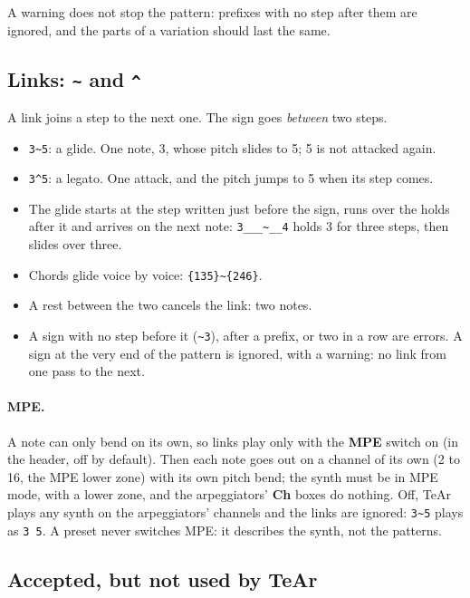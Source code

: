 \documentclass[11pt,a4paper]{article}
\newcommand{\pat}[1]{\texttt{#1}}
\begin{document}
A warning does not stop the pattern: prefixes with no step after them are
ignored, and the parts of a variation should last the same.

\subsection{Links: \pat{\textasciitilde} and \pat{\textasciicircum}}
\label{sec:links}

A link joins a step to the next one. The sign goes \emph{between} two steps.

\begin{itemize}[leftmargin=1.5em]
  \item \pat{3\textasciitilde5}: a glide. One note, 3, whose pitch slides to 5;
        5 is not attacked again.
  \item \pat{3\textasciicircum5}: a legato. One attack, and the pitch jumps to
        5 when its step comes.
  \item The glide starts at the step written just before the sign, runs over the
        holds after it and arrives on the next note:
        \pat{3\_\_\_\textasciitilde\_\_4} holds 3 for three steps, then slides
        over three.
  \item Chords glide voice by voice: \pat{\{135\}\textasciitilde\{246\}}.
  \item A rest between the two cancels the link: two notes.
  \item A sign with no step before it (\pat{\textasciitilde3}), after a prefix,
        or two in a row are errors. A sign at the very end of the pattern is
        ignored, with a warning: no link from one pass to the next.
\end{itemize}

\paragraph{MPE.} A note can only bend on its own, so links play only with the
\textbf{MPE} switch on (in the header, off by default). Then each note goes out on
a channel of its own (2 to 16, the MPE lower zone) with its own pitch bend; the
synth must be in MPE mode, with a lower zone, and the arpeggiators' \textbf{Ch}
boxes do nothing. Off, TeAr plays any synth on the arpeggiators' channels and the
links are ignored: \pat{3\textasciitilde5} plays as \pat{3 5}. A preset never
switches MPE: it describes the synth, not the patterns.

\subsection{Accepted, but not used by TeAr}
\end{document}
